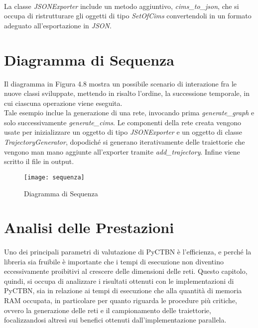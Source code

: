   \paragraph{}
  La classe \textit{JSONExporter} include un metodo aggiuntivo, \textit{cims\_to\_json}, 
  che si occupa di ristrutturare gli oggetti di tipo \textit{SetOfCims} convertendoli in un formato
  adeguato all'esportazione in \textit{JSON}.

  \section{Diagramma di Sequenza}
  Il diagramma in Figura 4.8 mostra un possibile scenario di interazione fra le nuove classi sviluppate,
  mettendo in risalto l'ordine, la successione temporale, in cui ciascuna operazione viene eseguita.\\
  Tale esempio inclue la generazione di una rete, invocando prima \textit{generate\_graph} e solo successivamente
  \textit{generate\_cims}. Le componenti della rete creata vengono usate per inizializzare un oggetto di tipo
  \textit{JSONExporter} e un oggetto di classe \textit{TrajectoryGenerator}, dopodiché si generano iterativamente
  delle traiettorie che vengono man mano aggiunte all'exporter tramite \textit{add\_trajectory}. 
  Infine viene scritto il file in output.

  \begin{figure}[H]
    \texttt{[image: sequenza]}
    \centering
    \caption{Diagramma di Sequenza}
  \end{figure}

  \section{Analisi delle Prestazioni}
  \paragraph{}
  Uno dei principali parametri di valutazione di PyCTBN è l'efficienza, e perché la libreria sia
  fruibile è importante che i tempi di esecuzione non diventino eccessivamente proibitivi al 
  crescere delle dimensioni delle reti.
  Questo capitolo, quindi, si occupa di analizzare i risultati ottenuti con le implementazioni
  di PyCTBN, sia in relazione ai tempi di esecuzione che alla quantità di memoria RAM occupata,
  in particolare per quanto riguarda le procedure più critiche, ovvero la generazione delle reti
  e il campionamento delle traiettorie, focalizzandosi altresì sui benefici ottenuti dall'implementazione
  parallela.

